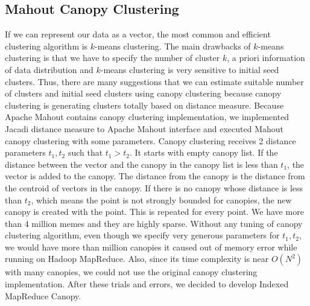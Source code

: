 \documentclass{sig-alternate}
\begin{document}
\subsection{Mahout Canopy Clustering}
If we can represent our data as a vector, the most common and efficient clustering algorithm is $k$-means clustering. The main drawbacks of $k$-means clustering is that we have to specify the number of cluster $k$, a priori information of data distribution and $k$-means clustering is very sensitive to initial seed clusters. Thus, there are many suggestions that we can estimate suitable number of clusters and initial seed clusters using canopy clustering \cite{McCallum2000} because canopy clustering is generating clusters totally based on distance measure. Because Apache Mahout contains canopy clustering implementation, we implemented Jacadi distance measure to Apache Mahout interface and executed Mahout canopy clustering with some parameters. Canopy clustering receives 2 distance parameters $t_1, t_2$ such that $t_1 > t_2$. It starts with empty canopy list. If the distance between the vector and the canopy in the canopy list is less than $t_1$, the vector is added to the canopy. The distance from the canopy is the distance from the centroid of vectors in the canopy. If there is no canopy whose distance is less than $t_2$, which means the point is not strongly bounded for canopies, the new canopy is created with the point. This is repeated for every point.
We have more than 4 million memes and they are highly sparse. Without any tuning of canopy clustering algorithm, even though we specify very generous parameters for $t_1,t_2$, we would have more than million canopies it caused out of memory error while running on Hadoop MapReduce. Also, since its time complexity is near $O(N^2)$ with many canopies, we could not use the original canopy clustering implementation. After these trials and errors, we decided to develop Indexed MapReduce Canopy.
\end{document}
